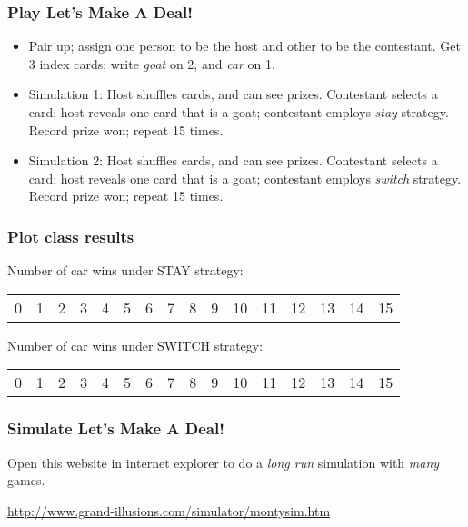 \begin{frame}
\frametitle{Play Let's Make A Deal!}
\begin{itemize}
    \item
    Pair up; assign one person to be the host and other to be the contestant.  Get 3 index cards; write \emph{goat} on 2, and \emph{car} on 1.
    \item
    Simulation 1: Host shuffles cards, and can see prizes.  Contestant selects a card; host reveals one card that is a goat; contestant employs \emph{stay} strategy.  Record prize won; repeat 15 times.
    \item
    Simulation 2: Host shuffles cards, and can see prizes.  Contestant selects a card; host reveals one card that is a goat; contestant employs \emph{switch} strategy.  Record prize won; repeat 15 times.
\end{itemize}
\end{frame}

\begin{frame}
\frametitle{Plot class results}
Number of car wins under STAY strategy:\\
\vskip50pt
\begin{center}
\begin{tabular}{cccccccccccccccc}
\hline
0 & 1 & 2 & 3 & 4 & 5 & 6 & 7 & 8 & 9 &  10 & 11 & 12 & 13 &14 & 15 \\
\end{tabular}
\end{center}
Number of car wins under SWITCH strategy:\\
\vskip50pt
\begin{center}
\begin{tabular}{cccccccccccccccc}
\hline
0 & 1 & 2 & 3 & 4 & 5 & 6 & 7 & 8 & 9 &  10 & 11 & 12 & 13 &14 & 15 \\
\end{tabular}
\end{center}
\end{frame}

\begin{frame}
\frametitle{Simulate Let's Make A Deal!}
Open this website in internet explorer to do a \emph{long run} simulation with \emph{many} games.
\begin{center}
\href{http://www.grand-illusions.com/simulator/montysim.htm}{http://www.grand-illusions.com/simulator/montysim.htm}
\end{center}
\end{frame}


